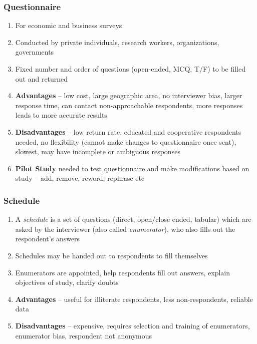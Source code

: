 \documentclass{article}
\begin{document}
\subsubsection{Questionnaire}

\begin{enumerate}
    \item For economic and business surveys
    \item Conducted by private individuals, research workers, organizations, governments
    \item Fixed number and order of questions (open-ended, MCQ, T/F) to be filled out and returned
    \item \textbf{Advantages} -- low cost, large geographic area, no interviewer bias, larger response time, can contact non-approachable respondents, more responses leads to more accurate results
    \item \textbf{Disadvantages} -- low return rate, educated and cooperative respondents needed, no flexibility (cannot make changes to questionnaire once sent), slowest, may have incomplete or ambiguous responses
    \item \textbf{Pilot Study} needed to test questionnaire and make modifications based on study -- add, remove, reword, rephrase etc
\end{enumerate}

\subsubsection{Schedule}

\begin{enumerate}
    \item A \textit{schedule} is a set of questions (direct, open/close ended, tabular) which are asked by the interviewer (also called \textit{enumerator}), who also fills out the respondent's answers
    \item Schedules may be handed out to respondents to fill themselves
    \item Enumerators are appointed, help respondents fill out answers, explain objectives of study, clarify doubts
    \item \textbf{Advantages} -- useful for illiterate respondents, less non-respondents, reliable data
    \item \textbf{Disadvantages} -- expensive, requires selection and training of enumerators, enumerator bias, respondent not anonymous
\end{enumerate}
\end{document}
